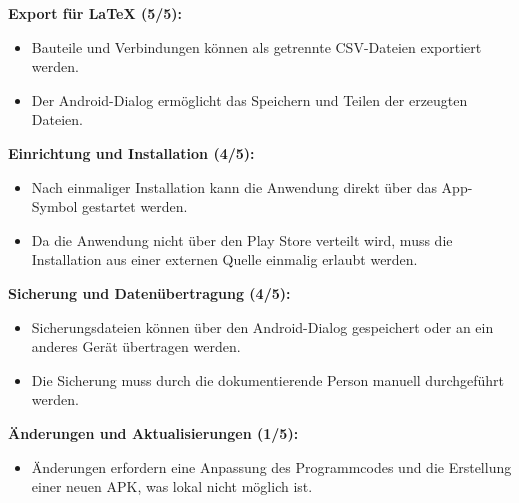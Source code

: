 \medskip
\textbf{Export für \LaTeX{} (5/5):}
\begin{itemize}[leftmargin=2em, nosep]
    \item[\pluspunkt] Bauteile und Verbindungen können als getrennte
    CSV-Dateien exportiert werden.
    \item[\pluspunkt] Der Android-Dialog ermöglicht das Speichern und Teilen
    der erzeugten Dateien.
\end{itemize}

\medskip
\textbf{Einrichtung und Installation (4/5):}
\begin{itemize}[leftmargin=2em, nosep]
    \item[\pluspunkt] Nach einmaliger Installation kann die Anwendung direkt
    über das App-Symbol gestartet werden.
    \item[\minuspunkt] Da die Anwendung nicht über den Play Store verteilt
    wird, muss die Installation aus einer externen Quelle einmalig erlaubt
    werden.
\end{itemize}

\medskip
\textbf{Sicherung und Datenübertragung (4/5):}
\begin{itemize}[leftmargin=2em, nosep]
    \item[\pluspunkt] Sicherungsdateien können über den Android-Dialog
    gespeichert oder an ein anderes Gerät übertragen werden.
    \item[\minuspunkt] Die Sicherung muss durch die dokumentierende Person
    manuell durchgeführt werden.
\end{itemize}

\medskip
\textbf{Änderungen und Aktualisierungen (1/5):}
\begin{itemize}[leftmargin=2em, nosep]
    \item[\minuspunkt] Änderungen erfordern eine Anpassung des Programmcodes
    und die Erstellung einer neuen APK, was lokal nicht möglich ist.
\end{itemize}